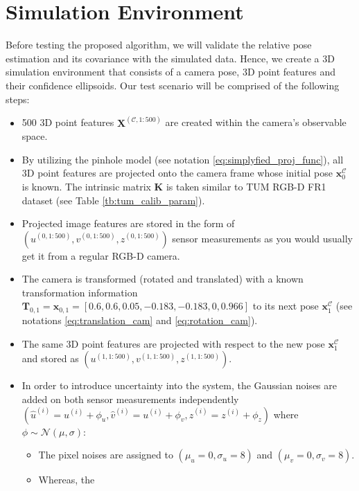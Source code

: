 \documentclass[12pt]{report}
\numberwithin{figure}{section}
\begin{document}
\section{Simulation Environment}\label{sc_sim_env}

Before testing the proposed algorithm, we will validate the relative 
pose estimation and its covariance with the simulated data. Hence, 
we create a 3D simulation environment that consists of a camera pose, 
3D point features and their confidence ellipsoids. Our test scenario 
will be comprised of the following steps:

\begin{itemize}
  \item 500 3D point features $\mathbf{X}^{(\mathcal{C}, 1:500)}$ are created 
  within the camera's observable space.
  \item By utilizing the pinhole model (see notation 
  \eqref{eq:simplyfied_proj_func}), 
    all 3D point features are projected 
    onto the camera frame whose initial pose $\mathbf{x}_0^{\mathcal{C}}$ is known. 
    The intrinsic matrix $\mathbf{K}$ is taken similar to TUM RGB-D FR1  
    dataset (see Table \ref{tb:tum_calib_param}).
  \item Projected image features are stored in the form of 
    $(u^{(0, 1:500)}, v^{(0, 1:500)},z^{(0, 1:500)})$ sensor 
    measurements as you would usually get it from 
      a regular RGB-D camera. 
    \item The camera is transformed (rotated and translated) with a known transformation information 
      $\mathbf{T}_{0,1} = \mathbf{x}_{0,1} = [0.6, 0.6, 0.05, -0.183, -0.183, 0, 0.966]$ 
      to its next pose $\mathbf{x}_1^{\mathcal{C}}$ 
      (see notations \eqref{eq:translation_cam} and \eqref{eq:rotation_cam}).
    \item The same 3D point features are projected with respect to the new pose 
      $\mathbf{x}_1^{\mathcal{C}}$ 
      and stored as $(u^{(1, 1:500)}, v^{(1, 1:500)},z^{(1, 1:500)})$.
    \item In order to introduce uncertainty into the system, the Gaussian 
      noises are added on both sensor measurements independently
      $(\hat{u}^{(i)}=u^{(i)}+\phi_u, 
        \hat{v}^{(i)}=u^{(i)}+\phi_v,
      \hat{z}^{(i)}=z^{(i)}+\phi_z)$ where $\phi\sim\mathcal{N}(\mu,\sigma)$:
      \begin{itemize}
          \item The pixel noises are
            assigned to $(\mu_u=0,\sigma_u=8)$ and $(\mu_v=0,\sigma_v=8)$. 
          \item Whereas, the 

\end{itemize}
\end{itemize}
\end{document}
